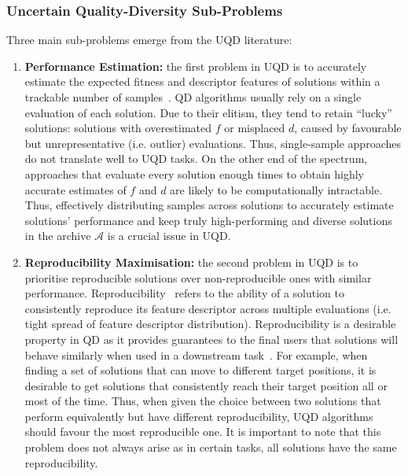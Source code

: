\subsubsection{Uncertain Quality-Diversity Sub-Problems} \label{sec:problems}
Three main sub-problems emerge from the UQD literature: 
\begin{enumerate}
    \item \textbf{Performance Estimation:} the first problem in UQD is to accurately estimate the expected fitness and descriptor features of solutions within a trackable number of samples~\cite{adaptive, flageat2020fast, flageat2023uncertain}. 
    QD algorithms usually rely on a single evaluation of each solution. Due to their elitism, they tend to retain “lucky” solutions: solutions with overestimated $f$ or misplaced $d$, caused by favourable but unrepresentative (i.e. outlier) evaluations. 
    Thus, single-sample approaches do not translate well to UQD tasks. 
    On the other end of the spectrum, approaches that evaluate every solution enough times to obtain highly accurate estimates of $f$ and $d$ are likely to be computationally intractable.
    Thus, effectively distributing samples across solutions to accurately estimate solutions' performance and keep truly high-performing and diverse solutions in the archive $\mathcal{A}$ is a crucial issue in UQD. 
    
    \item \textbf{Reproducibility Maximisation:} the second problem in UQD is to prioritise reproducible solutions over non-reproducible ones with similar performance.
    Reproducibility~\cite{flageat2023uncertain, grillotti2023don, mace2023quality} refers to the ability of a solution to consistently reproduce its feature descriptor across multiple evaluations (i.e. tight spread of feature descriptor distribution). Reproducibility is a desirable property in QD as it provides guarantees to the final users that solutions will behave similarly when used in a downstream task~\cite{huber2024domain, mace2023quality}. 
    For example, when finding a set of solutions that can move to different target positions, it is desirable to get solutions that consistently reach their target position all or most of the time. 
    Thus, when given the choice between two solutions that perform equivalently but have different reproducibility, UQD algorithms should favour the most reproducible one. 
    It is important to note that this problem does not always arise as in certain tasks, all solutions have the same reproducibility. 
    

\end{enumerate}
